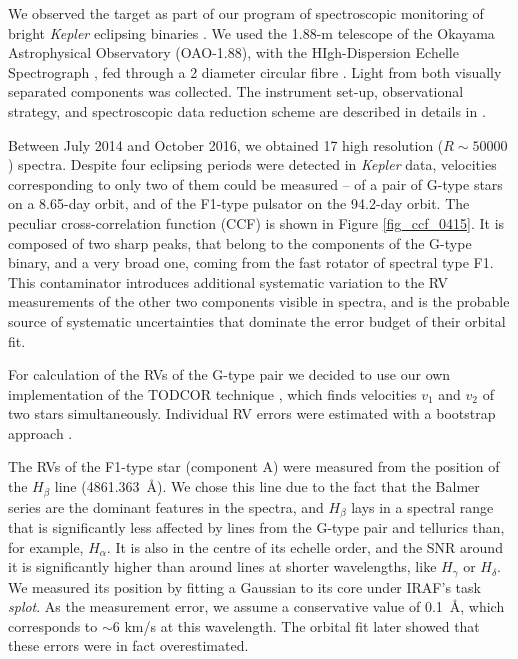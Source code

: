 \documentclass{aa}
\newcommand{\kep}{{\it Kepler }}
\begin{document}
We observed the target as part of our program of spectroscopic monitoring
of bright \kep eclipsing binaries \citep{hel15,hel16,hel17}. We used the 1.88-m
telescope of the Okayama Astrophysical Observatory (OAO-1.88), with the
HIgh-Dispersion Echelle Spectrograph \citep[HIDES;][]{izu99}, fed through a
2 diameter circular fibre \citep{kam13}. Light from both visually separated 
components was collected. The instrument set-up, observational strategy,
and spectroscopic data reduction scheme are described in details in \citet{hel16}.

Between July 2014 and October 2016, we obtained 17 high resolution
($R\sim50000$) spectra. Despite four eclipsing periods were detected in \kep data, 
velocities corresponding to only two of them could be measured -- of a pair of G-type 
stars on a 8.65-day orbit, and of the F1-type pulsator on the 94.2-day orbit.
The peculiar cross-correlation function (CCF) is shown in Figure \ref{fig_ccf_0415}. 
It is composed of two sharp peaks, that belong to the components of the G-type binary, 
and a very broad one, coming from the fast rotator of spectral type F1. This 
contaminator introduces additional systematic variation to the RV measurements of the 
other two components visible in spectra, and is the probable source of systematic 
uncertainties that dominate the error budget of their orbital fit. 

For calculation of the RVs of the G-type pair we decided to use our own implementation 
of the TODCOR technique \citep{zuc94}, which finds velocities $v_1$ and 
$v_2$ of two stars simultaneously. Individual RV errors were estimated with a 
bootstrap approach \citep{hel12}.

The RVs of the F1-type star (component A) were measured from the position
of the $H_\beta$ line (4861.363~\AA). We chose this line due to the
fact that the Balmer series are the dominant features in the spectra, and
$H_\beta$ lays in a spectral range that is significantly less affected by 
lines from the G-type pair and tellurics than, for example, $H_\alpha$. It is
also in the centre of its echelle order, and the SNR around it is significantly
higher than around lines at shorter wavelengths, like $H_\gamma$ or $H_\delta$. 
We measured its position by fitting a Gaussian to its core under IRAF's task
{\it splot}. As the measurement error, we assume a conservative value of 
0.1~\AA, which corresponds to $\sim$6 km/s at this wavelength. The orbital
fit later showed that these errors were in fact overestimated. 
\end{document}

